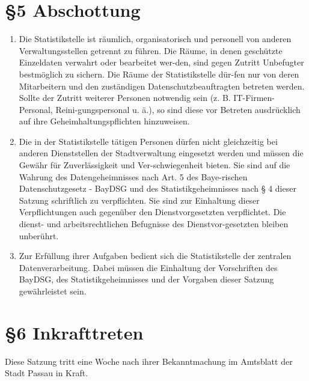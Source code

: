 \documentclass[A4, 12pt]{scrbook}
\begin{document}
  \section{\S5 Abschottung}
    \begin{enumerate}[label=(\arabic*)]
      \item Die Statistikstelle ist räumlich, organisatorisch und personell von anderen Verwaltungsstellen getrennt zu führen. Die Räume, in denen geschützte Einzeldaten verwahrt oder bearbeitet wer-den, sind gegen Zutritt Unbefugter bestmöglich zu sichern. Die Räume der Statistikstelle dür-fen nur von deren Mitarbeitern und den zuständigen Datenschutzbeauftragten betreten werden. Sollte der Zutritt weiterer Personen notwendig sein (z. B. IT-Firmen-Personal, Reini-gungspersonal u. ä.), so sind diese vor Betreten ausdrücklich auf ihre Geheimhaltungspflichten hinzuweisen. 
      \item Die in der Statistikstelle tätigen Personen dürfen nicht gleichzeitig bei anderen Dienststellen der Stadtverwaltung eingesetzt werden und müssen die Gewähr für Zuverlässigkeit und Ver-schwiegenheit bieten. Sie sind auf die Wahrung des Datengeheimnisses nach Art. 5 des Baye-rischen Datenschutzgesetz - BayDSG und des Statistikgeheimnisses nach § 4 dieser Satzung schriftlich zu verpflichten. Sie sind zur Einhaltung dieser Verpflichtungen auch gegenüber den Dienstvorgesetzten verpflichtet. Die dienst- und arbeitsrechtlichen Befugnisse des Dienstvor-gesetzten bleiben unberührt. 
      \item Zur Erfüllung ihrer Aufgaben bedient sich die Statistikstelle der zentralen Datenverarbeitung. Dabei müssen die Einhaltung der Vorschriften des BayDSG, des Statistikgeheimnisses und der Vorgaben dieser Satzung gewährleistet sein. 
    \end{enumerate}
    
    \section{\S6 Inkrafttreten}
    Diese Satzung tritt eine Woche nach ihrer Bekanntmachung im Amtsblatt der Stadt Passau in Kraft.
    
\end{document}
